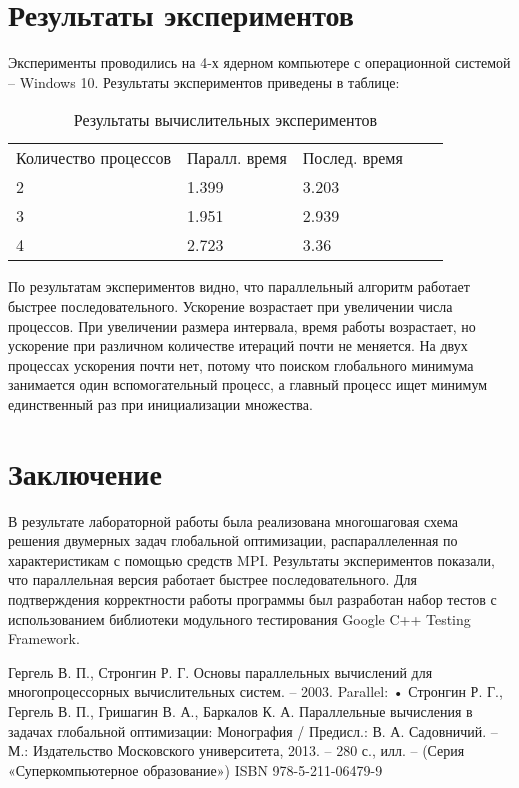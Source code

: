 \documentclass{report}
\begin{document}
\section*{Результаты экспериментов}
Эксперименты проводились на 4-х ядерном компьютере с операционной системой – Windows 10. Результаты экспериментов приведены в таблице:
\begin{table}[!h]
\caption{Результаты вычислительных экспериментов}
\centering
\begin{tabular}{lllll}
Количество процессов & Паралл. время & Послед. время \\
2  & 1.399  & 3.203\\
3 & 1.951 & 2.939\\
4  & 2.723 & 3.36\\
\end{tabular}
\end{table}
\par
По результатам экспериментов видно, что параллельный алгоритм работает быстрее последовательного. Ускорение возрастает при увеличении числа процессов. При увеличении размера интервала, время работы возрастает, но ускорение при различном количестве итераций почти не меняется. На двух процессах ускорения почти нет, потому что поиском глобального минимума занимается один вспомогательный процесс, а главный процесс ищет минимум единственный раз при инициализации множества.
\newpage

\section*{Заключение}
В результате лабораторной работы была реализована многошаговая схема решения двумерных задач глобальной оптимизации, распараллеленная по характеристикам с помощью средств MPI. Результаты экспериментов показали, что параллельная версия работает быстрее последовательного. Для подтверждения корректности работы программы был разработан набор тестов с использованием библиотеки модульного тестирования Google C++ Testing Framework.
\newpage

\begin{thebibliography}{1}
Гергель В. П., Стронгин Р. Г. Основы параллельных вычислений для многопроцессорных вычислительных систем. – 2003.
 Parallel: •	
Стронгин Р. Г., Гергель В. П., Гришагин В. А., Баркалов К. А. Параллельные вычисления в задачах глобальной оптимизации: Монография / Предисл.: В. А. Садовничий. – М.: Издательство Московского университета, 2013. – 280 с., илл.
– (Серия «Суперкомпьютерное образование») ISBN 978-5-211-06479-9


\end{thebibliography}
\newpage
\end{document}
